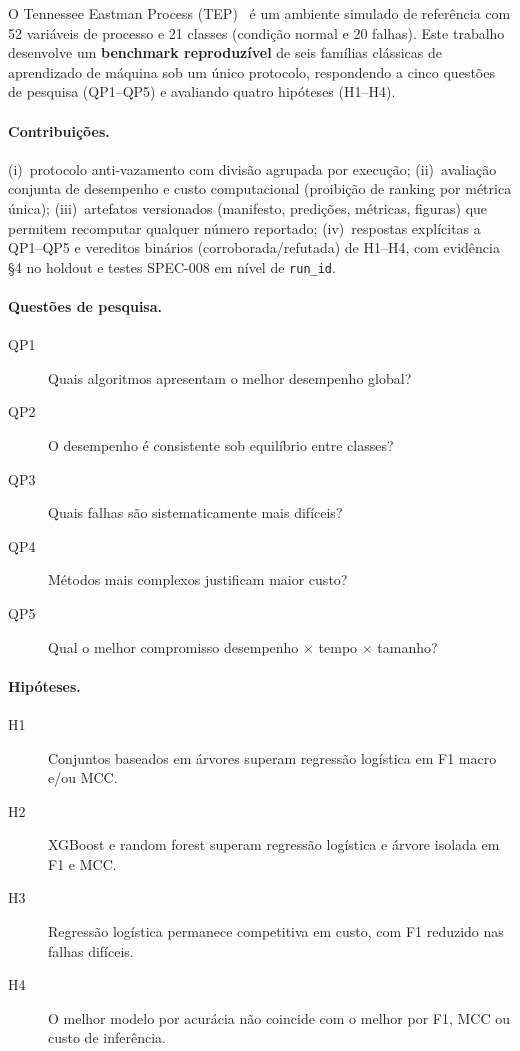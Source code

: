 \documentclass[11pt,a4paper]{article}
\begin{document}
O Tennessee Eastman Process (TEP)~\cite{downs1993tep} é um ambiente simulado de
referência com 52 variáveis de processo e 21 classes (condição normal e 20
falhas). Este trabalho desenvolve um \textbf{benchmark reproduzível} de seis
famílias clássicas de aprendizado de máquina sob um único protocolo, respondendo
a cinco questões de pesquisa (QP1--QP5) e avaliando quatro hipóteses (H1--H4).

\paragraph{Contribuições.}
(i)~protocolo anti-vazamento com divisão agrupada por execução;
(ii)~avaliação conjunta de desempenho e custo computacional (proibição de ranking
por métrica única);
(iii)~artefatos versionados (manifesto, predições, métricas, figuras) que
permitem recomputar qualquer número reportado;
(iv)~respostas explícitas a QP1--QP5 e vereditos binários (corroborada/refutada)
de H1--H4, com evidência §4 no holdout e testes SPEC-008 em nível de
\texttt{run\_id}.

\paragraph{Questões de pesquisa.}
\begin{description}
  \item[QP1] Quais algoritmos apresentam o melhor desempenho global?
  \item[QP2] O desempenho é consistente sob equilíbrio entre classes?
  \item[QP3] Quais falhas são sistematicamente mais difíceis?
  \item[QP4] Métodos mais complexos justificam maior custo?
  \item[QP5] Qual o melhor compromisso desempenho $\times$ tempo $\times$ tamanho?
\end{description}

\paragraph{Hipóteses.}
\begin{description}
  \item[H1] Conjuntos baseados em árvores superam regressão logística em F1
  macro e/ou MCC.
  \item[H2] XGBoost e random forest superam regressão logística e árvore isolada
  em F1 e MCC.
  \item[H3] Regressão logística permanece competitiva em custo, com F1 reduzido
  nas falhas difíceis.
  \item[H4] O melhor modelo por acurácia não coincide com o melhor por F1, MCC
  ou custo de inferência.
\end{description}
\end{document}
